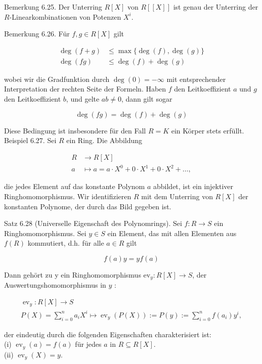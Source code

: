\documentclass[10pt, letterpaper]{article}
\begin{document}
Bemerkung 6.25. Der Unterring $R[X]$ von $R[[X]]$ ist genau der Unterring der $R$-Linearkombinationen von Potenzen $X^{i}$.

Bemerkung 6.26. Für $f, g \in R[X]$ gilt

$$
\begin{aligned}
\operatorname{deg}(f+g) & \leq \max \{\operatorname{deg}(f), \operatorname{deg}(g)\} \\
\operatorname{deg}(f g) & \leq \operatorname{deg}(f)+\operatorname{deg}(g)
\end{aligned}
$$

wobei wir die Gradfunktion durch $\operatorname{deg}(0)=-\infty$ mit entsprechender Interpretation der rechten Seite der Formeln. Haben $f$ den Leitkoeffizient $a$ und $g$ den Leitkoeffizient $b$, und gelte $a b \neq 0$, dann gilt sogar

$$
\operatorname{deg}(f g)=\operatorname{deg}(f)+\operatorname{deg}(g)
$$

Diese Bedingung ist insbesondere für den Fall $R=K$ ein Körper stets erfüllt.\\
Beispiel 6.27. Sei $R$ ein Ring. Die Abbildung

$$
\begin{aligned}
R & \rightarrow R[X] \\
a & \mapsto a=a \cdot X^{0}+0 \cdot X^{1}+0 \cdot X^{2}+\ldots,
\end{aligned}
$$

die jedes Element auf das konstante Polynom $a$ abbildet, ist ein injektiver Ringhomomorphismus. Wir identifizieren $R$ mit dem Unterring von $R[X]$ der konstanten Polynome, der durch das Bild gegeben ist.

Satz 6.28 (Universelle Eigenschaft des Polynomrings). Sei $f: R \rightarrow S$ ein Ringhomomorphismus. Sei $y \in S$ ein Element, das mit allen Elementen aus $f(R)$ kommutiert, d.h. für alle $a \in R$ gilt

$$
f(a) y=y f(a)
$$

Dann gehört zu y ein Ringhomomorphismus $\mathrm{ev}_{y}: R[X] \rightarrow S$, der Auswertungshomomorphismus in $y$ :

$$
\begin{gathered}
\operatorname{ev}_{y}: R[X] \rightarrow S \\
P(X)=\sum_{i=0}^{n} a_{i} X^{i} \mapsto \operatorname{ev}_{y}(P(X)):=P(y):=\sum_{i=0}^{n} f\left(a_{i}\right) y^{i},
\end{gathered}
$$

der eindeutig durch die folgenden Eigenschaften charakterisiert ist:\\
(i) $\operatorname{ev}_{y}(a)=f(a)$ für jedes $a$ in $R \subseteq R[X]$.\\
(ii) $\operatorname{ev}_{y}(X)=y$.
\end{document}

